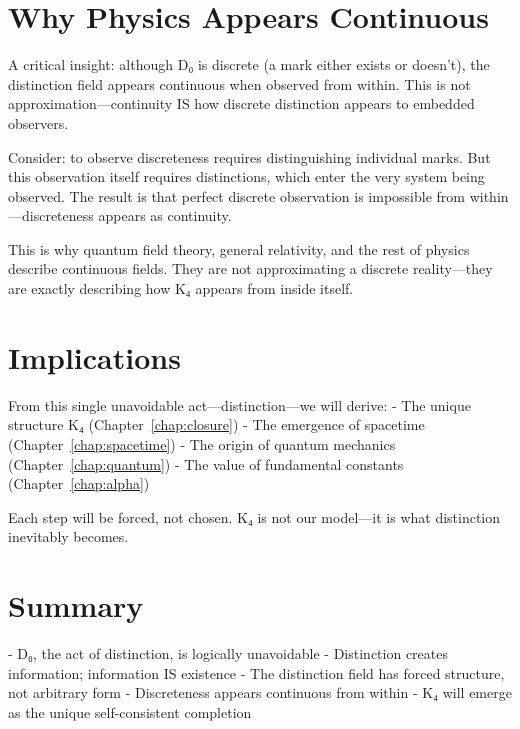 \section{Why Physics Appears Continuous}

A critical insight: although D₀ is discrete (a mark either exists or doesn't), the distinction field appears continuous when observed from within. This is not approximation—continuity IS how discrete distinction appears to embedded observers.

Consider: to observe discreteness requires distinguishing individual marks. But this observation itself requires distinctions, which enter the very system being observed. The result is that perfect discrete observation is impossible from within—discreteness appears as continuity.

This is why quantum field theory, general relativity, and the rest of physics describe continuous fields. They are not approximating a discrete reality—they are exactly describing how K₄ appears from inside itself.

\section{Implications}

From this single unavoidable act—distinction—we will derive:
- The unique structure K₄ (Chapter~\ref{chap:closure})  
- The emergence of spacetime (Chapter~\ref{chap:spacetime})
- The origin of quantum mechanics (Chapter~\ref{chap:quantum})
- The value of fundamental constants (Chapter~\ref{chap:alpha})

Each step will be forced, not chosen. K₄ is not our model—it is what distinction inevitably becomes.

\section{Summary}

- D₀, the act of distinction, is logically unavoidable
- Distinction creates information; information IS existence  
- The distinction field has forced structure, not arbitrary form
- Discreteness appears continuous from within
- K₄ will emerge as the unique self-consistent completion
